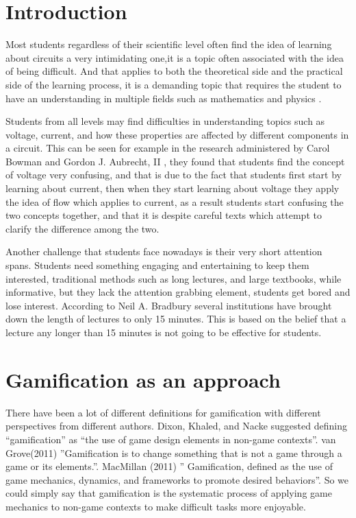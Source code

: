 \documentclass[twoside,a4paper,11pt]{article}
\begin{document}
\begin{multicols}{2}
\footnotesize
\justifying
\section{Introduction}

Most students regardless of their scientific level often find the idea of learning about circuits a very intimidating one,it is a topic often associated with the idea of being difficult. And that applies to both the theoretical side and the practical side of the learning process, it is a demanding topic that requires the student to have an understanding in multiple fields such as mathematics and physics . 

Students from all levels may find difficulties in understanding topics such as voltage, current, and how these properties are affected by different components in a circuit. This can be seen for example in the research administered by Carol Bowman and Gordon J. Aubrecht, II \cite{1}, they found that students find the concept of voltage very confusing, and that is due to the fact that students first start by learning about current, then when they start learning about voltage they apply the idea of flow which applies to current, as a result students start confusing the two concepts together, and that it is despite careful texts which attempt to clarify the difference among the two.

Another challenge that students face nowadays is their very short attention spans. Students need something engaging and entertaining to keep them interested, traditional methods such as long lectures, and large textbooks, while informative, but they lack the attention grabbing element, students get bored and lose interest. According to Neil A. Bradbury \cite{17} several institutions have brought down the length of lectures to only 15 minutes. This is based on the belief that a lecture any longer than 15 minutes is not going to be effective for students.
\vfill
\section{Gamification as an approach}
There have been a lot of different definitions for gamification with different perspectives from different authors. Dixon, Khaled, and Nacke suggested defining “gamification” as “the use of game design elements in non-game contexts”. van Grove(2011) \cite{2} ”Gamification is to change something that is not a game through a game or its elements.”. MacMillan (2011) \cite{3} ” Gamification, defined as the use of game mechanics, dynamics, and frameworks to promote desired behaviors”. So we could simply say that gamification is the systematic process of applying game mechanics to non-game contexts to make difficult tasks more enjoyable. 


\end{multicols}
\end{document}
